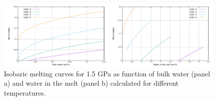 \documentclass[hidelinks,10pt,a4paper]{article}
\begin{document}
\begin{figure}
\noindent\includegraphics[width=\textwidth]{./Figures/Water.pdf}
\caption{Isobaric melting curves for 1.5 GPa as function of bulk water (panel a) and water in the melt (panel b) calculated for different temperatures.}
\label{fig:water}
\end{figure}

\clearpage


\end{document}
